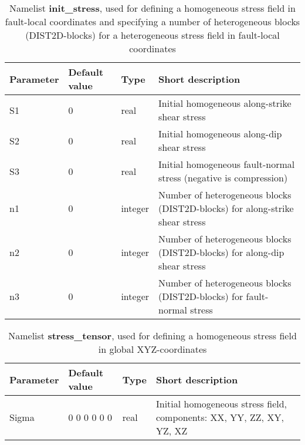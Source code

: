 \documentclass[12pt,twoside]{article}
\begin{document}
\begin{table}[H]
\caption{Namelist \textbf{init\_stress}, used for defining a homogeneous stress field in fault-local coordinates
	and specifying a number of heterogeneous blocks (DIST2D-blocks) for a heterogeneous stress field in fault-local coordinates}
\begin{center}
\begin{tabular}{|p{4.8cm}|p{2cm}|p{2cm}|p{5.4cm}|}
\hline
Parameter & Default value & Type & Short description \\
\hline
\hline
S1 & 0 & real & Initial homogeneous along-strike shear stress\\
S2 & 0 & real & Initial homogeneous along-dip shear stress\\
S3 & 0 & real & Initial homogeneous fault-normal stress (negative is compression)\\
n1 & 0 & integer & Number of heterogeneous blocks (DIST2D-blocks) for along-strike shear stress\\
n2 & 0 & integer & Number of heterogeneous blocks (DIST2D-blocks) for along-dip shear stress\\
n3 & 0 & integer & Number of heterogeneous blocks (DIST2D-blocks) for fault-normal stress\\
\hline
\end{tabular}
\end{center}
\label{init_stress-table}
\end{table}

\begin{table}[H]
\caption{Namelist \textbf{stress\_tensor}, used for defining a homogeneous stress field in global XYZ-coordinates}
\begin{center}
\begin{tabular}{|p{4.8cm}|p{2cm}|p{2cm}|p{5.4cm}|}
\hline
Parameter & Default value & Type & Short description \\
\hline
\hline
Sigma & 0 0 0 0 0 0 & real & Initial homogeneous stress field, components: XX, YY, ZZ, XY, YZ, XZ\\
\hline
\end{tabular}
\end{center}
\label{stress_tensor-table}
\end{table}
\end{document}
